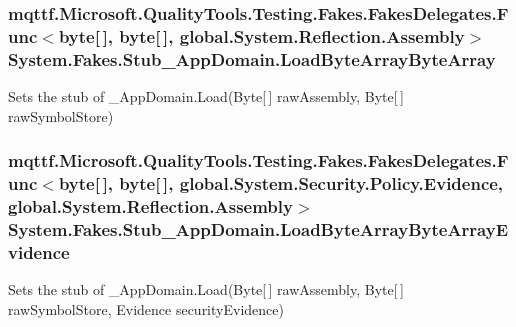 \hypertarget{class_system_1_1_fakes_1_1_stub___app_domain_aeb6abbcfa938525c034468f5ac5af1b2}{
\subsubsection[{Load\-Byte\-Array\-Byte\-Array}]{\setlength{\rightskip}{0pt plus 5cm}mqttf.\-Microsoft.\-Quality\-Tools.\-Testing.\-Fakes.\-Fakes\-Delegates.\-Func$<$byte\mbox{[}$\,$\mbox{]}, byte\mbox{[}$\,$\mbox{]}, global.\-System.\-Reflection.\-Assembly$>$ System.\-Fakes.\-Stub\-\_\-\-App\-Domain.\-Load\-Byte\-Array\-Byte\-Array}}\label{class_system_1_1_fakes_1_1_stub___app_domain_aeb6abbcfa938525c034468f5ac5af1b2}


Sets the stub of \-\_\-\-App\-Domain.\-Load(\-Byte\mbox{[}$\,$\mbox{]} raw\-Assembly, Byte\mbox{[}$\,$\mbox{]} raw\-Symbol\-Store)

\hypertarget{class_system_1_1_fakes_1_1_stub___app_domain_a406e555e91840f82cfa010650e553f8a}{
\subsubsection[{Load\-Byte\-Array\-Byte\-Array\-Evidence}]{\setlength{\rightskip}{0pt plus 5cm}mqttf.\-Microsoft.\-Quality\-Tools.\-Testing.\-Fakes.\-Fakes\-Delegates.\-Func$<$byte\mbox{[}$\,$\mbox{]}, byte\mbox{[}$\,$\mbox{]}, global.\-System.\-Security.\-Policy.\-Evidence, global.\-System.\-Reflection.\-Assembly$>$ System.\-Fakes.\-Stub\-\_\-\-App\-Domain.\-Load\-Byte\-Array\-Byte\-Array\-Evidence}}\label{class_system_1_1_fakes_1_1_stub___app_domain_a406e555e91840f82cfa010650e553f8a}


Sets the stub of \-\_\-\-App\-Domain.\-Load(\-Byte\mbox{[}$\,$\mbox{]} raw\-Assembly, Byte\mbox{[}$\,$\mbox{]} raw\-Symbol\-Store, Evidence security\-Evidence)

